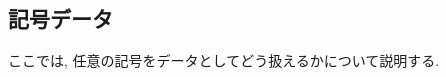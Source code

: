 \setcounter{section}{2}
\setcounter{subsection}{2}
%
\subsection{記号データ}
ここでは, 任意の記号をデータとしてどう扱えるかについて説明する.
%

